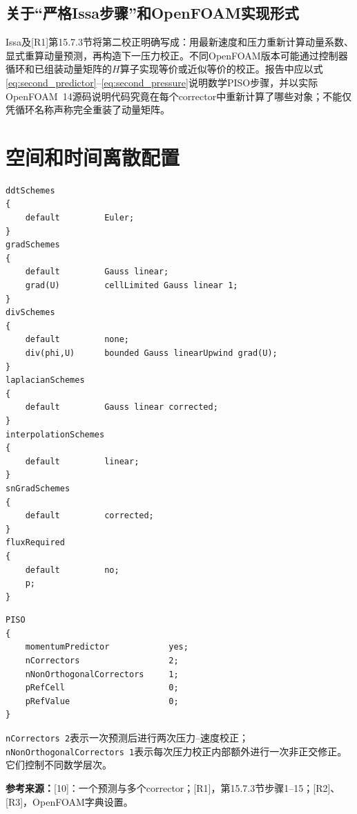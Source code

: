 \documentclass[UTF8,12pt,a4paper]{ctexart}
\numberwithin{equation}{section}
\newcommand{\Issa}{\textnormal{[10]}}
\newcommand{\Rone}{\textnormal{[R1]}}
\newcommand{\Rtwo}{\textnormal{[R2]}}
\newcommand{\Rthree}{\textnormal{[R3]}}
\newcommand{\source}[1]{\par\smallskip\noindent\colorbox{sourcebg}{%
  \parbox{0.955\linewidth}{\footnotesize\color{sourcegray}\textbf{参考来源：}#1}}\par\smallskip}
\begin{document}
\subsection{关于“严格Issa步骤”和OpenFOAM实现形式}
Issa及\Rone 第15.7.3节将第二校正明确写成：用最新速度和压力重新计算动量系数、显式重算动量预测，再构造下一压力校正。不同OpenFOAM版本可能通过控制器循环和已组装动量矩阵的$H$算子实现等价或近似等价的校正。报告中应以式\eqref{eq:second_predictor}--\eqref{eq:second_pressure}说明数学PISO步骤，并以实际OpenFOAM~14源码说明代码究竟在每个corrector中重新计算了哪些对象；不能仅凭循环名称声称完全重装了动量矩阵。

\section{空间和时间离散配置}
\begin{lstlisting}[style=foam]
ddtSchemes
{
    default         Euler;
}
gradSchemes
{
    default         Gauss linear;
    grad(U)         cellLimited Gauss linear 1;
}
divSchemes
{
    default         none;
    div(phi,U)      bounded Gauss linearUpwind grad(U);
}
laplacianSchemes
{
    default         Gauss linear corrected;
}
interpolationSchemes
{
    default         linear;
}
snGradSchemes
{
    default         corrected;
}
fluxRequired
{
    default         no;
    p;
}
\end{lstlisting}

\begin{lstlisting}[style=foam]
PISO
{
    momentumPredictor            yes;
    nCorrectors                  2;
    nNonOrthogonalCorrectors     1;
    pRefCell                     0;
    pRefValue                    0;
}
\end{lstlisting}
\texttt{nCorrectors 2}表示一次预测后进行两次压力--速度校正；\texttt{nNonOrthogonalCorrectors 1}表示每次压力校正内部额外进行一次非正交修正。它们控制不同数学层次。
\source{\Issa：一个预测与多个corrector；\Rone，第15.7.3节步骤1--15；\Rtwo、\Rthree，OpenFOAM字典设置。}
\end{document}
